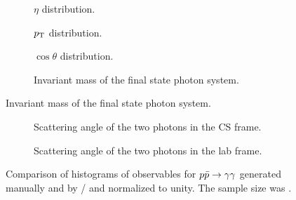 \begin{figure}[hp]
  \centering
  \begin{subfigure}{.49\textwidth}
    \centering {}
    \caption{\label{fig:pdf-eta} \(\eta\) distribution.}
  \end{subfigure}
  \begin{subfigure}{.49\textwidth}
    \centering {}
    \caption{\label{fig:pdf-pt} \(p_\mathrm{T}\) distribution.}
  \end{subfigure}
  \begin{subfigure}{.49\textwidth}
    \centering {}
    \caption{\label{fig:pdf-cos-theta} \(\cos\theta\) distribution.}
  \end{subfigure}
  \begin{subfigure}{.49\textwidth}
    \centering {}
    \caption[Histogram of the invariant mass of the final state photon
    system.]{\label{fig:pdf-inv-m} Invariant mass of the
      final state photon system. %
    }
  \end{subfigure}
\end{figure}

\begin{figure}
  \ContinuedFloat
  \begin{subfigure}{.49\textwidth}
    \centering {}
    \caption{\label{fig:pdf-o-angle-cs} Scattering angle of the two
      photons in the CS frame.}
  \end{subfigure}
  \begin{subfigure}{.49\textwidth}
    \centering {}
    \caption{\label{fig:pdf-o-angle} Scattering angle of the two
      photons in the lab frame.}
  \end{subfigure}
  \caption{\label{fig:pdf-histos}Comparison of histograms of
    observables for \(p\bar{p}\rightarrow\gamma\gamma\) generated manually and by \sherpa/\rivet
    and normalized to unity. The sample size was \protect
    . }
\end{figure}

